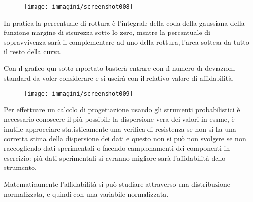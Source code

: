\documentclass{article}
\begin{document}
\begin{adjustwidth}{2in}{}
     	\begin{figure}[H]
     		\centering
     		\texttt{[image: immagini/screenshot008]}
     		\label{fig:screenshot008}
     	\end{figure}
     	   	
     	In pratica la percentuale di rottura è l'integrale della coda della gaussiana della funzione margine di sicurezza sotto lo zero, mentre la percentuale di sopravvivenza sarà il complementare ad uno della rottura, l'area sottesa da tutto il resto della curva. 
     	
     	Con il grafico qui sotto riportato basterà entrare con il numero di deviazioni standard da voler considerare e si uscirà con il relativo valore di affidabilità. 
     	
     	\begin{figure}[H]
     		\centering
     		\texttt{[image: immagini/screenshot009]}
     		\label{fig:screenshot009}
     	\end{figure}
     	
     	Per effettuare un calcolo di progettazione usando gli strumenti probabilistici è necessario conoscere il più possibile la dispersione vera dei valori in esame, è inutile approcciare statisticamente una verifica di resistenza se non si ha una corretta stima della dispersione dei dati e questo non si può non svolgere se non raccogliendo dati sperimentali o facendo campionamenti dei componenti in esercizio: più dati sperimentali si avranno migliore sarà l'affidabilità dello strumento.
     		
     	Matematicamente l'affidabilità si può studiare attraverso una distribuzione normalizzata, e quindi con una variabile normalizzata. 
     	

\end{adjustwidth}
\end{document}
